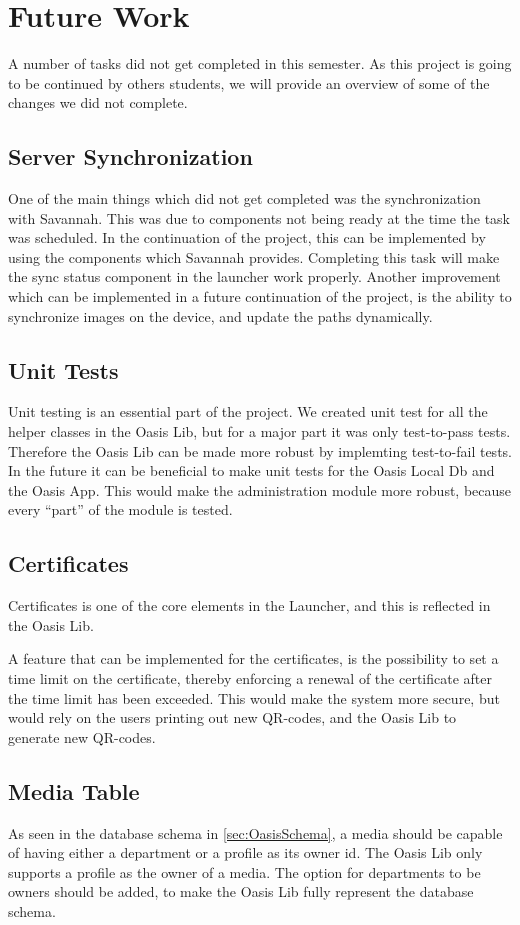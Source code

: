 \chapter{Future Work}
A number of tasks did not get completed in this semester. As this project is going to be continued by others students, we will provide an overview of some of the changes we did not complete. 

\section{Server Synchronization}
One of the main things which did not get completed was the synchronization with Savannah.
This was due to components not being ready at the time the task was scheduled.
In the continuation of the project, this can be implemented by using the components which Savannah provides.
Completing this task will make the sync status component in the launcher work properly.
Another improvement which can be implemented in a future continuation of the project, is the ability to synchronize images on the device, and update the paths dynamically.

\section{Unit Tests}
Unit testing is an essential part of the project.
We created unit test for all the helper classes in the Oasis Lib, but for a major part it was only test-to-pass tests.
Therefore the Oasis Lib can be made more robust by implemting test-to-fail tests.
In the future it can be beneficial to make unit tests for the Oasis Local Db and the Oasis App.
This would make the administration module more robust, because every ``part'' of the module is tested.

\section{Certificates}
Certificates is one of the core elements in the Launcher, and this is reflected in the Oasis Lib.

A feature that can be implemented for the certificates, is the possibility to set a time limit on the certificate, thereby enforcing a renewal of the certificate after the time limit has been exceeded.
This would make the system more secure, but would rely on the users printing out new QR-codes, and the Oasis Lib to generate new QR-codes.

\section{Media Table}
As seen in the database schema in \vref{sec:OasisSchema}, a media should be capable of having either a department or a profile as its owner id.
The Oasis Lib only supports a profile as the owner of a media.
The option for departments to be owners should be added, to make the Oasis Lib fully represent the database schema.

